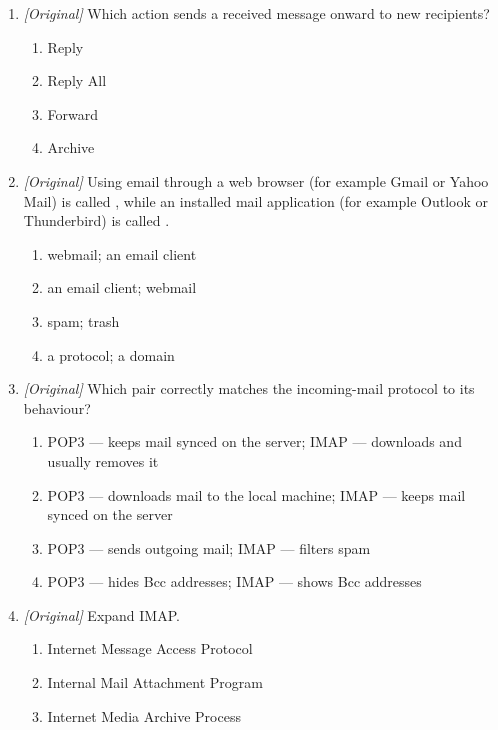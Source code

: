 \documentclass[11pt]{article}
\begin{document}
\begin{enumerate}[label=\textbf{Q\arabic*.}, leftmargin=*]
\begin{enumerate}[label=\Alph*.]
    \item Save as Draft
    \item Mark as Spam
  \end{enumerate}
\item \textit{[Original]} Which action sends a received message onward to new recipients?
  \begin{enumerate}[label=\Alph*.]
    \item Reply
    \item Reply All
    \item Forward
    \item Archive
  \end{enumerate}
\item \textit{[Original]} Using email through a web browser (for example Gmail or Yahoo Mail) is called \underline{\hspace{2.2cm}}, while an installed mail application (for example Outlook or Thunderbird) is called \underline{\hspace{2.2cm}}.
  \begin{enumerate}[label=\Alph*.]
    \item webmail; an email client
    \item an email client; webmail
    \item spam; trash
    \item a protocol; a domain
  \end{enumerate}
\item \textit{[Original]} Which pair correctly matches the incoming-mail protocol to its behaviour?
  \begin{enumerate}[label=\Alph*.]
    \item POP3 --- keeps mail synced on the server; IMAP --- downloads and usually removes it
    \item POP3 --- downloads mail to the local machine; IMAP --- keeps mail synced on the server
    \item POP3 --- sends outgoing mail; IMAP --- filters spam
    \item POP3 --- hides Bcc addresses; IMAP --- shows Bcc addresses
  \end{enumerate}
\item \textit{[Original]} Expand IMAP.
  \begin{enumerate}[label=\Alph*.]
    \item Internet Message Access Protocol
    \item Internal Mail Attachment Program
    \item Internet Media Archive Process

\end{enumerate}
\end{enumerate}
\end{document}
